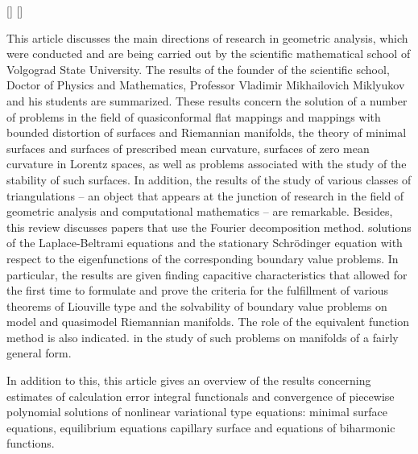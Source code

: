 \documentclass[a4paper,11pt,twoside]{article}
\begin{document}
\begin{thebibliography}{99}

[]
[]
\mkpaperr


\end{thebibliography}


\begin{summary} 
This article discusses the main directions of research in geometric analysis, which were conducted and are being carried out by the scientific mathematical school of Volgograd State University.
The results of the founder of the scientific school, Doctor of Physics and Mathematics, Professor Vladimir Mikhailovich Miklyukov and his students are summarized. These results concern the solution of a number of problems in the field of quasiconformal flat mappings and mappings with bounded distortion of surfaces and Riemannian manifolds, the theory of minimal surfaces and surfaces of prescribed mean curvature, surfaces of zero mean curvature in Lorentz spaces, as well as problems associated with the study of the stability of such surfaces. In addition, the results of the study of various classes of triangulations -- an object that appears at the junction of research in the field of geometric analysis and computational mathematics -- are remarkable.
Besides, this review discusses papers that use the Fourier decomposition method.
solutions of the Laplace-Beltrami equations
and the stationary Schr\"{o}dinger equation with respect to the eigenfunctions of the corresponding boundary value problems. In particular, the results are given
finding capacitive characteristics that allowed for the first time to formulate
and prove the criteria for the fulfillment of various theorems of Liouville type and the solvability of boundary value problems on
model and quasimodel Riemannian manifolds. The role of the equivalent function method is also indicated.
in the study of such problems on manifolds of a fairly general form.

In addition to this, this article gives an overview of the results concerning estimates of calculation error
 integral functionals and convergence of piecewise polynomial solutions of nonlinear
 variational type equations: minimal surface equations, equilibrium equations
 capillary surface and equations of biharmonic functions.

\end{summary}
\end{document}
